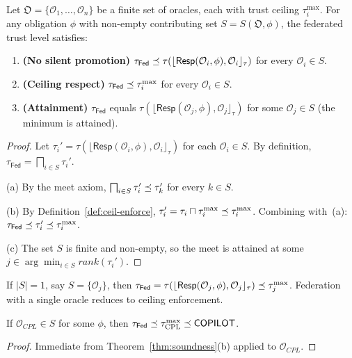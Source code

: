 \documentclass[11pt]{article}
\newcommand{\Oracle}{\mathcal{O}}            %
\newcommand{\OrcSet}{\mathfrak{O}}           %
\newcommand{\Orcl}[1]{\Oracle_{#1}}         %
\newcommand{\tlev}[1]{\tau(#1)}              %
\newcommand{\tmin}{\sqcap}                   %
\newcommand{\Fed}{\mathsf{Fed}}             %
\newcommand{\Ceil}[1]{\lfloor #1 \rfloor_{\tau}}   %
\newcommand{\Resp}{\mathsf{Resp}}           %
\begin{document}
\begin{theorem}\label{thm:soundness}
  Let $\OrcSet = \{\Orcl{1}, \ldots, \Orcl{n}\}$ be a finite set of
  oracles, each with trust ceiling $\tau_i^{\max}$.  For any obligation
  $\phi$ with non-empty contributing set $S = S(\OrcSet,\phi)$, the
  federated trust level satisfies:
  \begin{enumerate}[label=(\alph*)]
    \item \textbf{(No silent promotion)}
          $\tau_{\Fed} \tleq \tlev{\Ceil{\Resp(\Orcl{i},\phi),\Orcl{i}}}$
          for every $\Orcl{i} \in S$.
    \item \textbf{(Ceiling respect)}
          $\tau_{\Fed} \tleq \tau_i^{\max}$ for every $\Orcl{i} \in S$.
    \item \textbf{(Attainment)}
          $\tau_{\Fed}$ equals
          $\tlev{\Ceil{\Resp(\Orcl{j},\phi),\Orcl{j}}}$ for some
          $\Orcl{j} \in S$ (the minimum is attained).
  \end{enumerate}
\end{theorem}

\begin{proof}
  Let $\tau_i' = \tlev{\Ceil{\Resp(\Orcl{i},\phi),\Orcl{i}}}$ for each
  $\Orcl{i} \in S$.  By definition,
  $\tau_{\Fed} = \bigsqcap_{i \in S} \tau_i'$.

  \noindent(a) By the meet axiom, $\bigsqcap_{i \in S} \tau_i' \preceq
  \tau_k'$ for every $k \in S$.

  \noindent(b) By Definition~\ref{def:ceil-enforce},
  $\tau_i' = \tau_i \tmin \tau_i^{\max} \tleq \tau_i^{\max}$.
  Combining with~(a): $\tau_{\Fed} \tleq \tau_i' \tleq \tau_i^{\max}$.

  \noindent(c) The set $S$ is finite and non-empty, so the meet is
  attained at some $j \in \arg\min_{i \in S} \mathit{rank}(\tau_i')$.
\end{proof}

\begin{corollary}\label{cor:single}
  If $|S| = 1$, say $S = \{\Orcl{j}\}$, then
  $\tau_{\Fed} = \tlev{\Ceil{\Resp(\Orcl{j},\phi),\Orcl{j}}}
               \tleq \tau_j^{\max}$.
  Federation with a single oracle reduces to ceiling enforcement.
\end{corollary}

\begin{corollary}
  \label{cor:copilot-safe}
  If $\Orcl{CPL} \in S$ for some $\phi$, then
  $\tau_{\Fed} \tleq \tau^{\max}_{\mathrm{CPL}} \tleq \Tcopilot$.
\end{corollary}
\begin{proof}
  Immediate from Theorem~\ref{thm:soundness}(b) applied to
  $\Orcl{CPL}$.
\end{proof}
\end{document}
